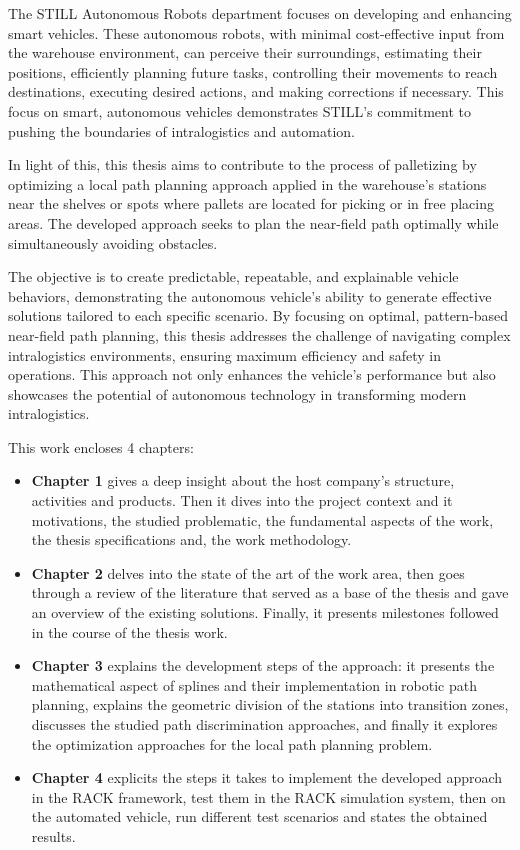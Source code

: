 The STILL Autonomous Robots department focuses on developing and enhancing smart vehicles. These autonomous robots, 
with minimal cost-effective input from the warehouse environment, can perceive their surroundings, estimating their 
positions, efficiently planning future tasks, controlling their movements to reach destinations, executing desired 
actions, and making corrections if necessary. This focus on smart, autonomous vehicles demonstrates STILL's commitment 
to pushing the boundaries of intralogistics and automation. 

In light of this, this thesis aims to contribute to the process of palletizing by optimizing a local path planning 
approach applied in the warehouse's stations near the shelves or spots where pallets are located for picking or in 
free placing areas. The developed approach seeks to plan the near-field path optimally while simultaneously avoiding 
obstacles. 

The objective is to create predictable, repeatable, and explainable vehicle behaviors, demonstrating the autonomous 
vehicle's ability to generate effective solutions tailored to each specific scenario. By focusing on optimal, 
pattern-based near-field path planning, this thesis addresses the challenge of navigating complex intralogistics 
environments, ensuring maximum efficiency and safety in operations. This approach not only enhances the vehicle's 
performance but also showcases the potential of autonomous technology in transforming modern intralogistics. 


This work encloses 4 chapters: 
\begin{itemize}
    \item \textbf{Chapter 1} gives a deep insight about the host company’s structure, activities and products. 
    Then it dives into the project context and it motivations, the studied problematic, the fundamental aspects of 
    the work, the thesis specifications and, the work methodology. 
    \item \textbf{Chapter 2} delves into the state of the art of the work area, then goes through a review of the 
    literature that served as a base of the thesis and gave an overview of the existing solutions. Finally, 
    it presents milestones followed in the course of the thesis work. 
    \item \textbf{Chapter 3} explains the development steps of the approach: it presents the mathematical aspect of 
    splines and their implementation in robotic path planning, explains the geometric division of the stations 
    into transition zones, discusses the studied path discrimination approaches, and finally it explores the optimization 
    approaches for the local path planning problem. 
    \item \textbf{Chapter 4} explicits the steps it takes to implement the developed approach in the RACK framework, 
    test them in the RACK simulation system, then on the automated vehicle, run different test scenarios and states 
    the obtained results. 
\end{itemize}

\newpage
\thispagestyle{intro}